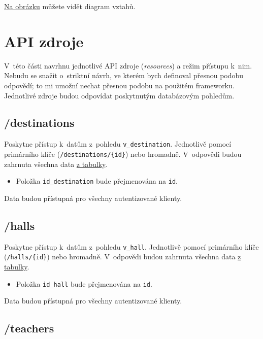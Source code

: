 \protect\hyperlink{pic:diagram}{Na obrázku} můžete vidět diagram vztahů.

\section{API zdroje}\label{api-zdroje}

V~této části navrhnu jednotlivé API zdroje (\emph{resources}) a režim přístupu k~nim. Nebudu se snažit o~striktní návrh, ve kterém bych definoval přesnou podobu odpovědí; to mi umožní nechat přesnou podobu na použitém frameworku. Jednotlivé zdroje budou odpovídat poskytnutým databázovým pohledům.

\subsection{/destinations}\label{destinations}

Poskytne přístup k~datům z~pohledu \verb!v_destination!. Jednotlivě pomocí primárního klíče (\verb!/destinations/{id}!) nebo hromadně. V~odpovědi budou zahrnuta všechna data \protect\hyperlink{tab:destination}{z tabulky}.

\begin{itemize}
\tightlist
\item
  Položka \verb!id_destination! bude přejmenována na \verb!id!.
\end{itemize}

Data budou přístupná pro všechny autentizované klienty.

\subsection{/halls}\label{halls}

Poskytne přístup k~datům z~pohledu \verb!v_hall!. Jednotlivě pomocí primárního klíče (\verb!/halls/{id}!) nebo hromadně. V~odpovědi budou zahrnuta všechna data \protect\hyperlink{tab:hall}{z tabulky}.

\begin{itemize}
\tightlist
\item
  Položka \verb!id_hall! bude přejmenována na \verb!id!.
\end{itemize}

Data budou přístupná pro všechny autentizované klienty.

\subsection{/teachers}\label{teachers}

